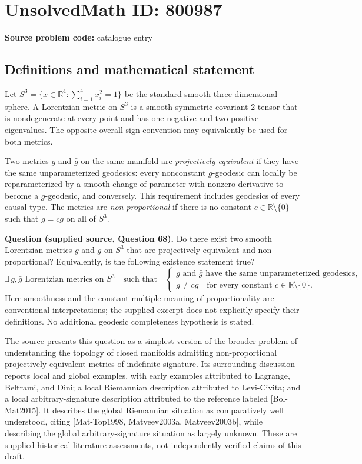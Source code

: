 \documentclass[11pt]{article}
\newcommand{\R}{\mathbb{R}}
\begin{document}
\section*{UnsolvedMath ID: 800987}
\textbf{Source problem code:} catalogue entry
\subsection{Definitions and mathematical statement}
Let \(S^{3}=\{x\in\R^{4}:\sum_{i=1}^{4}x_i^{2}=1\}\) be the standard smooth three-dimensional sphere. A Lorentzian metric on \(S^{3}\) is a smooth symmetric covariant \(2\)-tensor that is nondegenerate at every point and has one negative and two positive eigenvalues. The opposite overall sign convention may equivalently be used for both metrics.

Two metrics \(g\) and \(\bar g\) on the same manifold are \emph{projectively equivalent} if they have the same unparameterized geodesics: every nonconstant \(g\)-geodesic can locally be reparameterized by a smooth change of parameter with nonzero derivative to become a \(\bar g\)-geodesic, and conversely. This requirement includes geodesics of every causal type. The metrics are \emph{non-proportional} if there is no constant \(c\in\R\setminus\{0\}\) such that \(\bar g=cg\) on all of \(S^{3}\).

\textbf{Question (supplied source, Question 68).} Do there exist two smooth Lorentzian metrics \(g\) and \(\bar g\) on \(S^{3}\) that are projectively equivalent and non-proportional? Equivalently, is the following existence statement true?
\[
\exists\,g,\bar g\text{ Lorentzian metrics on }S^{3}
\quad\text{such that}\quad
\begin{cases}
 g\text{ and }\bar g\text{ have the same unparameterized geodesics},\\
 \bar g\ne cg\quad\text{for every constant }c\in\R\setminus\{0\}.
\end{cases}
\]
Here smoothness and the constant-multiple meaning of proportionality are conventional interpretations; the supplied excerpt does not explicitly specify their definitions. No additional geodesic completeness hypothesis is stated.

The source presents this question as a simplest version of the broader problem of understanding the topology of closed manifolds admitting non-proportional projectively equivalent metrics of indefinite signature. Its surrounding discussion reports local and global examples, with early examples attributed to Lagrange, Beltrami, and Dini; a local Riemannian description attributed to Levi-Civita; and a local arbitrary-signature description attributed to the reference labeled [Bol-Mat2015]. It describes the global Riemannian situation as comparatively well understood, citing [Mat-Top1998, Matveev2003a, Matveev2003b], while describing the global arbitrary-signature situation as largely unknown. These are supplied historical literature assessments, not independently verified claims of this draft.
\end{document}
